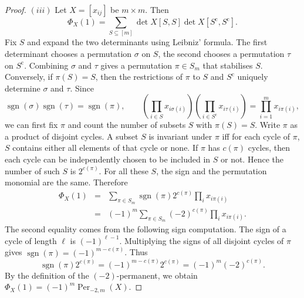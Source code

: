 \documentclass[11pt,a4paper]{article}
\begin{document}
\begin{proof}
$(iii)$ Let $X=[x_{ij}]$ be $m\times m$. Then
\[
  \Phi_X(1)=\sum_{S\subseteq[m]}
  \det X[S,S]\det X[S^{\mathrm{c}},S^{\mathrm{c}}].
\]
Fix $S$ and expand the two determinants using Leibniz' formula. The first determinant chooses a permutation $\sigma$ on $S$, the second chooses a permutation $\tau$ on $S^{\mathrm{c}}$. Combining $\sigma$ and $\tau$ gives a permutation $\pi\in S_m$ that stabilises $S$. Conversely, if $\pi(S)=S$, then the restrictions of $\pi$ to $S$ and $S^{\mathrm{c}}$ uniquely determine $\sigma$ and $\tau$. Since
\[
  \operatorname{sgn}(\sigma)\operatorname{sgn}(\tau)=\operatorname{sgn}(\pi),
  \qquad
  \left(\prod_{i\in S}x_{i\sigma(i)}\right)
  \left(\prod_{i\in S^{\mathrm{c}}}x_{i\tau(i)}\right)
  =\prod_{i=1}^m x_{i\pi(i)},
\]
we can first fix $\pi$ and count the number of subsets $S$ with $\pi(S)=S$.
Write $\pi$ as a product of disjoint cycles. A subset $S$ is invariant under $\pi$ iff for each cycle of $\pi$, $S$ contains either all elements of that cycle or none. If $\pi$ has $c(\pi)$ cycles, then each cycle can be independently chosen to be included in $S$ or not. Hence the number of such $S$ is $2^{c(\pi)}$. For all these $S$, the sign and the permutation monomial are the same. Therefore
\begin{eqnarray*}
  \Phi_X(1)
  &=&\sum_{\pi\in S_m}\operatorname{sgn}(\pi)2^{c(\pi)}
    \prod_i x_{i\pi(i)}  \\
  &=&(-1)^m\sum_{\pi\in S_m}(-2)^{c(\pi)}
    \prod_i x_{i\pi(i)}.
\end{eqnarray*}
The second equality comes from the following sign computation. The sign of a cycle of length $\ell$ is $(-1)^{\ell-1}$. Multiplying the signs of all disjoint cycles of $\pi$ gives $\operatorname{sgn}(\pi)=(-1)^{m-c(\pi)}$.
Thus
\[
  \operatorname{sgn}(\pi)2^{c(\pi)}
  =(-1)^{m-c(\pi)}2^{c(\pi)}
  =(-1)^m(-2)^{c(\pi)}.
\]
By the definition of the $(-2)$-permanent, we obtain $\Phi_X(1)=(-1)^m\operatorname{Per}_{-2,m}(X)$.
\end{proof}
\end{document}
